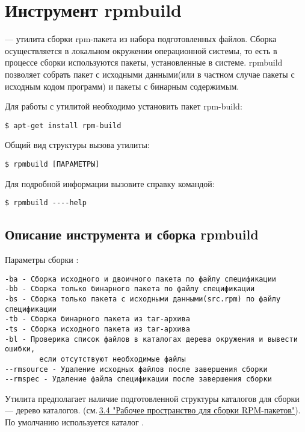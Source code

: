 \hypertarget{rpmbuild}{\chapter{Инструмент rpmbuild}}\label{chapter-rpmbuild}


 --- утилита сборки rpm-пакета из набора подготовленных файлов. Сборка осуществляется
в локальном окружении операционной системы, то есть в процессе сборки используются пакеты,
установленные в системе. rpmbuild позволяет собрать пакет с исходными данными(или в частном
случае пакеты с исходным кодом программ) и пакеты с бинарным содержимым.

Для работы с утилитой необходимо установить пакет rpm-build:

\begin{verbatim}
$ apt-get install rpm-build
\end{verbatim}

Общий вид структуры вызова утилиты:

\begin{verbatim}
$ rpmbuild [ПАРАМЕТРЫ]
\end{verbatim}

Для подробной информации вызовите справку командой:

\begin{verbatim}
$ rpmbuild ----help
\end{verbatim}

\section{Описание инструмента и сборка rpmbuild}

Параметры сборки :
\begin{verbatim}
-ba - Сборка исходного и двоичного пакета по файлу спецификации
-bb - Cборка только бинарного пакета по файлу спецификации
-bs - Cборка только пакета c исходными данными(src.rpm) по файлу спецификации
-tb - Сборка бинарного пакета из tar-архива
-ts - Сборка исходного пакета из tar-архива
-bl - Проверика список файлов в каталогах дерева окружения и вывести ошибки,
        если отсутствуют необходимые файлы
--rmsource - Удаление исходных файлов после завершения сборки
--rmspec - Удаление файла спецификации после завершения сборки
\end{verbatim}

Утилита предполагает наличие подготовленной структуры каталогов для сборки --- дерево каталогов.
(см.\,\hyperlink{3.4}{3.4 "Рабочее пространство для сборки RPM-пакетов"}). По умолчанию используется
каталог .

